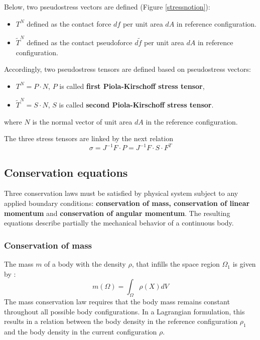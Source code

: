Below, two pseudostress vectors are defined (Figure  \ref{stressnotion}):
\begin{itemize}
\item $T^N$ defined as the contact force $df$ per unit area $dA$ in reference configuration.
\item $\tilde{T}^N$ defined as the contact pseudoforce $d\tilde{f}$ per unit area $dA$ in reference configuration.  
\end{itemize}


Accordingly, two pseudostress tensors are defined based on pseudostress vectors:
\begin{itemize}
\item $T^N = P \cdot N$, $P$ is called \textbf{first Piola-Kirschoff stress tensor},
\item  $\tilde{T}^N = S \cdot N $, $S$ is called \textbf{second Piola-Kirschoff stress tensor}. 
\end{itemize} 
where $N$ is the normal vector of unit area $dA$ in the reference configuration.

The three stress tensors are linked by the next relation 
\begin{equation}
\sigma = J^{-1}F \cdot P = J^{-1} F \cdot S \cdot F^T
\label{PK12}
\end{equation}


\subsection{Conservation equations}\label{subsection:conservationequations}
Three conservation laws must be satisfied by physical system subject to any applied boundary conditions: \textbf{conservation of mass, conservation of linear momentum} and \textbf{conservation of angular momentum}. The resulting equations describe partially the mechanical behavior of a continuous body.

\subsubsection*{ Conservation of mass}
The mass $m$ of a body with the density $\rho$, that infills the space region $\Omega_1$ is given by :
\begin{equation}
m(\Omega) = \int_{\Omega} \rho(X)dV
\end{equation}
The mass conservation law requires that the body mass remains constant throughout all possible body configurations. In a Lagrangian formulation, this results in a relation between the body density in the reference configuration $\rho_1$ and the body density in the current configuration $\rho$.

